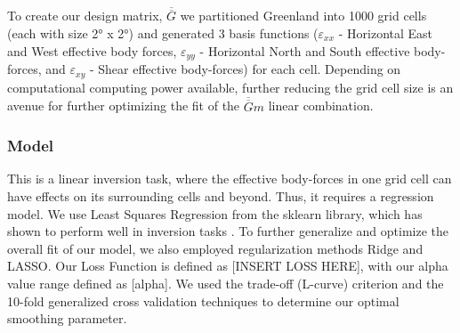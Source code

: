 \documentclass{article}
\begin{document}
To create our design matrix, $\overline{\overline{G}}$ we partitioned Greenland into 1000 grid cells (each with size 2° x 2°) and generated 3 basis functions ($\varepsilon_{xx}$ - Horizontal East and West effective body forces, $\varepsilon_{yy}$ - Horizontal North and South effective body-forces, and $\varepsilon_{xy}$ - Shear effective body-forces) for each cell. Depending on computational computing power available, further reducing the grid cell size is an avenue for further optimizing the fit of the  $\overline{\overline{G}} m$ linear combination.   



\subsubsection{Model}

This is a linear inversion task, where the effective body-forces in one grid cell can have effects on its surrounding cells and beyond. Thus, it requires a regression model. We use Least Squares Regression from the sklearn library, which has shown to perform well in inversion tasks \cite{lines_review_1984}. To further generalize and optimize the overall fit of our model, we also employed regularization methods Ridge and LASSO. Our Loss Function is defined as [INSERT LOSS HERE], with our alpha value range defined as [alpha]. We used the trade-off (L-curve) criterion and the 10-fold generalized cross validation techniques to determine our optimal smoothing parameter. 

\end{document}
